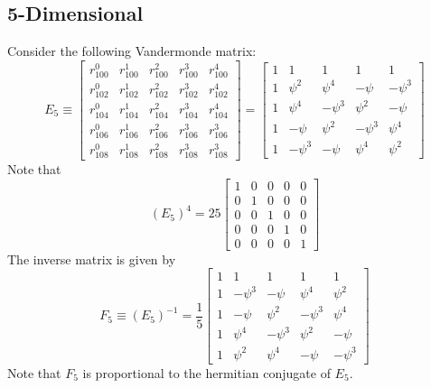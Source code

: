\subsection{5-Dimensional}
Consider the following Vandermonde matrix:
\begin{equation}
    E_{5} \equiv \begin{bmatrix}
        r_{100}^{0} & r_{100}^{1} & r_{100}^{2} & r_{100}^{3} & r_{100}^{4} \\
        r_{102}^{0} & r_{102}^{1} & r_{102}^{2} & r_{102}^{3} & r_{102}^{4} \\
        r_{104}^{0} & r_{104}^{1} & r_{104}^{2} & r_{104}^{3} & r_{104}^{4} \\
        r_{106}^{0} & r_{106}^{1} & r_{106}^{2} & r_{106}^{3} & r_{106}^{3} \\
        r_{108}^{0} & r_{108}^{1} & r_{108}^{2} & r_{108}^{3} & r_{108}^{3}
    \end{bmatrix} = \begin{bmatrix}
        1 & 1 & 1 & 1 & 1 \\
        1 & \psi^{2} & \psi^{4} & -\psi & -\psi^{3} \\
        1 & \psi^{4} & -\psi^{3} & \psi^{2} & -\psi \\
        1 & -\psi & \psi^{2} & -\psi^{3} & \psi^{4} \\
        1 & -\psi^{3} & -\psi & \psi^{4} & \psi^{2}
    \end{bmatrix}
\end{equation}
Note that
\begin{equation}
    \left( E_{5} \right)^{4} = 25 \begin{bmatrix}
        1 & 0 & 0 & 0 & 0 \\
        0 & 1 & 0 & 0 & 0 \\
        0 & 0 & 1 & 0 & 0 \\
        0 & 0 & 0 & 1 & 0 \\
        0 & 0 & 0 & 0 & 1
    \end{bmatrix}
\end{equation}
The inverse matrix is given by
\begin{equation}
    F_{5} \equiv \left( E_{5} \right)^{-1} = \frac{1}{5} \begin{bmatrix}
        1 & 1 & 1 & 1 & 1 \\
        1 & -\psi^{3} & -\psi & \psi^{4} & \psi^{2} \\
        1 & -\psi & \psi^{2} & -\psi^{3} & \psi^{4} \\
        1 & \psi^{4} & -\psi^{3} & \psi^{2} & -\psi \\
        1 & \psi^{2} & \psi^{4} & -\psi & -\psi^{3}
    \end{bmatrix}
\end{equation}
Note that $F_{5}$ is proportional to the hermitian conjugate of $E_{5}$.

